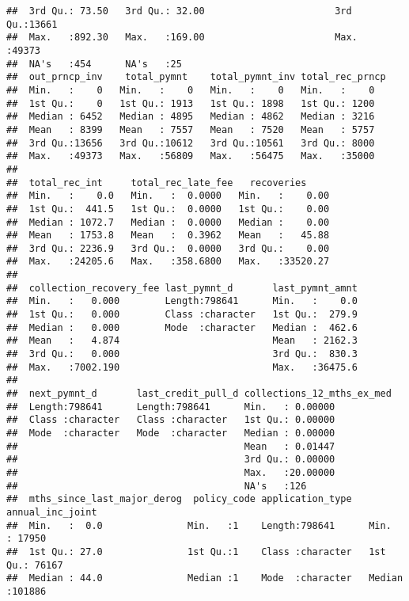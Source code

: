 \documentclass[
]{article}
\begin{document}
\begin{verbatim}
##  3rd Qu.: 73.50   3rd Qu.: 32.00                       3rd Qu.:13661  
##  Max.   :892.30   Max.   :169.00                       Max.   :49373  
##  NA's   :454      NA's   :25                                          
##  out_prncp_inv    total_pymnt    total_pymnt_inv total_rec_prncp
##  Min.   :    0   Min.   :    0   Min.   :    0   Min.   :    0  
##  1st Qu.:    0   1st Qu.: 1913   1st Qu.: 1898   1st Qu.: 1200  
##  Median : 6452   Median : 4895   Median : 4862   Median : 3216  
##  Mean   : 8399   Mean   : 7557   Mean   : 7520   Mean   : 5757  
##  3rd Qu.:13656   3rd Qu.:10612   3rd Qu.:10561   3rd Qu.: 8000  
##  Max.   :49373   Max.   :56809   Max.   :56475   Max.   :35000  
##                                                                 
##  total_rec_int     total_rec_late_fee   recoveries      
##  Min.   :    0.0   Min.   :  0.0000   Min.   :    0.00  
##  1st Qu.:  441.5   1st Qu.:  0.0000   1st Qu.:    0.00  
##  Median : 1072.7   Median :  0.0000   Median :    0.00  
##  Mean   : 1753.8   Mean   :  0.3962   Mean   :   45.88  
##  3rd Qu.: 2236.9   3rd Qu.:  0.0000   3rd Qu.:    0.00  
##  Max.   :24205.6   Max.   :358.6800   Max.   :33520.27  
##                                                         
##  collection_recovery_fee last_pymnt_d       last_pymnt_amnt  
##  Min.   :   0.000        Length:798641      Min.   :    0.0  
##  1st Qu.:   0.000        Class :character   1st Qu.:  279.9  
##  Median :   0.000        Mode  :character   Median :  462.6  
##  Mean   :   4.874                           Mean   : 2162.3  
##  3rd Qu.:   0.000                           3rd Qu.:  830.3  
##  Max.   :7002.190                           Max.   :36475.6  
##                                                              
##  next_pymnt_d       last_credit_pull_d collections_12_mths_ex_med
##  Length:798641      Length:798641      Min.   : 0.00000          
##  Class :character   Class :character   1st Qu.: 0.00000          
##  Mode  :character   Mode  :character   Median : 0.00000          
##                                        Mean   : 0.01447          
##                                        3rd Qu.: 0.00000          
##                                        Max.   :20.00000          
##                                        NA's   :126               
##  mths_since_last_major_derog  policy_code application_type   annual_inc_joint
##  Min.   :  0.0               Min.   :1    Length:798641      Min.   : 17950  
##  1st Qu.: 27.0               1st Qu.:1    Class :character   1st Qu.: 76167  
##  Median : 44.0               Median :1    Mode  :character   Median :101886  

\end{verbatim}
\end{document}
